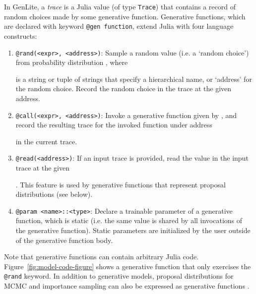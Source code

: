 In GenLite, a \emph{trace} is a Julia value (of type \texttt{Trace}) that contains a record of random choices made by some generative function.
Generative functions, which are declared with keyword \texttt{@gen function}, extend Julia with four language constructs:
\begin{enumerate}
\item \texttt{@rand(<expr>, <address>)}: Sample a random value (i.e. a `random choice') from probability distribution \expr{}, where \address{} is a string or tuple of strings that specify a hierarchical name, or `address' for the random choice.
Record the random choice in the trace at the given address.
\item \texttt{@call(<expr>, <address>)}: Invoke a generative function given by \expr{}, and record the resulting trace for the invoked function under address \address{} in the current trace.
\item \texttt{@read(<address>)}: If an input trace is provided, read the value in the input trace at the given \address{}.
This feature is used by generative functions that represent proposal distributions (see below).
\item \texttt{@param <name>::<type>}: Declare a trainable parameter of a generative function, which is static (i.e. the same value is shared by all invocations of the generative function).
Static parameters are initialized by the user outside of the generative function body.
\end{enumerate}

Note that generative functions can contain arbitrary Julia code.
Figure~\ref{fig:model-code-figure} shows a generative function that only exercises the \texttt{@rand} keyword.
In addition to generative models, proposal distributions for MCMC and importance sampling can also be expressed as generative functions \cite{cusumano2018using}.

